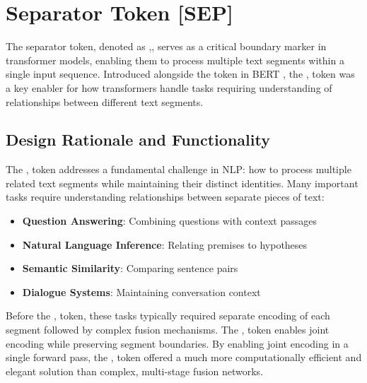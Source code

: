\section{Separator Token [SEP]}

The separator token, denoted as \sep{}, serves as a critical boundary marker in transformer models, enabling them to process multiple text segments within a single input sequence. Introduced alongside the \cls{} token in BERT \citep{devlin2018bert}, the \sep{} token was a key enabler for how transformers handle tasks requiring understanding of relationships between different text segments.

\subsection{Design Rationale and Functionality}

The \sep{} token addresses a fundamental challenge in NLP: how to process multiple related text segments while maintaining their distinct identities. Many important tasks require understanding relationships between separate pieces of text:

\begin{itemize}
\item \textbf{Question Answering}: Combining questions with context passages
\item \textbf{Natural Language Inference}: Relating premises to hypotheses  
\item \textbf{Semantic Similarity}: Comparing sentence pairs
\item \textbf{Dialogue Systems}: Maintaining conversation context
\end{itemize}

Before the \sep{} token, these tasks typically required separate encoding of each segment followed by complex fusion mechanisms. The \sep{} token enables joint encoding while preserving segment boundaries. By enabling joint encoding in a single forward pass, the \sep{} token offered a much more computationally efficient and elegant solution than complex, multi-stage fusion networks.

